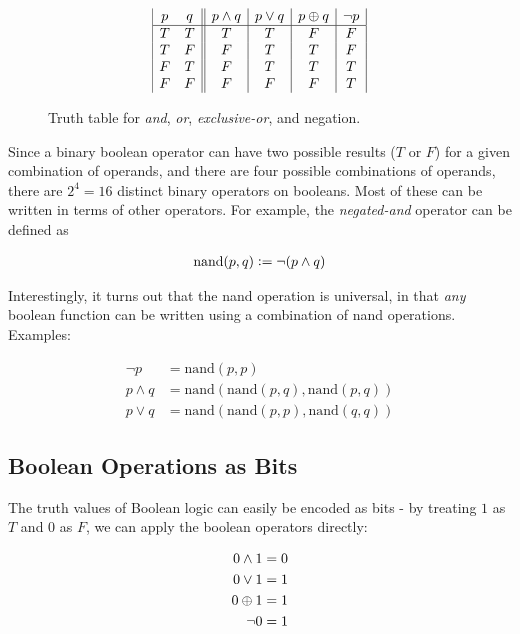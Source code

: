 \begin{figure}
  \centering

  \begin{displaymath}
\begin{array}{|c c||c|c|c|c|}
p & q & p \land q & p \lor q & p \oplus q & \neg p \\
\hline
T & T & T & T & F & F\\
T & F & F & T & T & F\\
F & T & F & T & T & T\\
F & F & F & F & F & T\\
\end{array}
\end{displaymath}
  \caption{Truth table for \emph{and}, \emph{or}, \emph{exclusive-or}, and negation.}
  \label{fig:truth-tables}
\end{figure}

Since a binary boolean operator can have two possible results ($T$ or
$F$) for a given combination of operands, and there are four possible
combinations of operands, there are $2^{4}=16$ distinct binary
operators on booleans.  Most of these can be written in terms of other
operators.  For example, the \emph{negated-and} operator can be defined as

\begin{align}
  \mathrm{nand}(p,q) \vcentcolon= \neg (p \land q)
\end{align}

Interestingly, it turns out that the nand operation is universal, in
that \emph{any} boolean function can be written using a combination of
nand operations.  Examples:

\begin{align}
  \neg p &= \mathrm{nand}(p,p) \\
  p \land q &= \mathrm{nand}(\mathrm{nand}(p,q),\mathrm{nand}(p,q)) \\
  p \lor q &= \mathrm{nand}(\mathrm{nand}(p,p),\mathrm{nand}(q,q))
\end{align}

\subsection{Boolean Operations as Bits}

The truth values of Boolean logic can easily be encoded as bits - by
treating $1$ as $T$ and $0$ as $F$, we can apply the boolean operators
directly:

\begin{align}
  0 \land 1 &= 0 \\
  0 \lor 1 &= 1 \\
  0 \oplus 1 &= 1 \\
  \neg 0 &= 1
\end{align}

